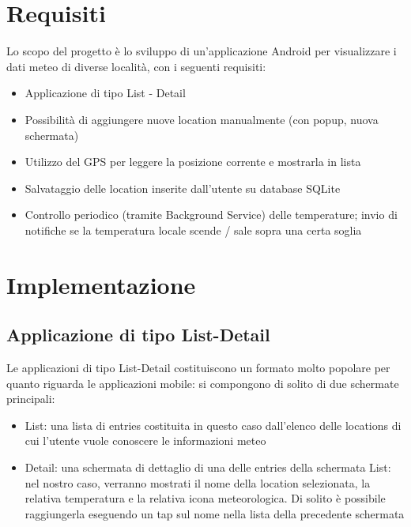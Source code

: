 \documentclass[twoside]{supsistudent}
\begin{document}
\maketitle
\onehalfspacing
\frontmatter


\tableofcontents


\newpage
\mainmatter
{}
\setcounter{page}{1}

\chapter{Requisiti}
Lo scopo del progetto è lo sviluppo di un'applicazione Android per visualizzare i dati meteo di diverse località, con i seguenti requisiti:
\begin{itemize}
\item Applicazione di tipo List - Detail
\item Possibilità di aggiungere nuove location manualmente (con popup, nuova schermata)
\item Utilizzo del GPS per leggere la posizione corrente e mostrarla in lista
\item Salvataggio delle location inserite dall'utente su database SQLite
\item Controllo periodico (tramite Background Service) delle temperature; invio di notifiche se la temperatura locale scende / sale sopra una certa soglia
\end{itemize}


\chapter{Implementazione}


\section{Applicazione di tipo List-Detail}

Le applicazioni di tipo List-Detail costituiscono un formato molto popolare per quanto riguarda le applicazioni mobile: si compongono di solito di due schermate principali:

\begin{itemize}
\item List: una lista di entries costituita in questo caso dall'elenco delle locations di cui l'utente vuole conoscere le informazioni meteo

\item Detail: una schermata di dettaglio di una delle entries della schermata List: nel nostro caso, verranno mostrati il nome della location selezionata, la relativa temperatura e la relativa icona meteorologica. Di solito è possibile raggiungerla eseguendo un tap sul nome nella lista della precedente schermata
\end{itemize}
\end{document}

